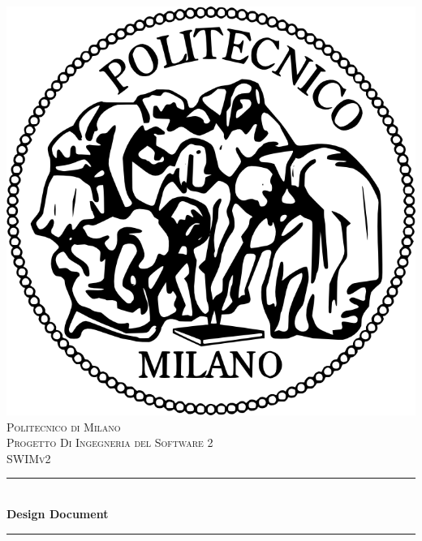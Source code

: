 \documentclass[12pt]{article}
\begin{document}
\begin{titlepage}

\newcommand{\HRule}{\rule{\linewidth}{0.5mm}} %

\center %
\includegraphics[scale=0.22]{polimi.png} \\[2\baselineskip] 
 

\textsc{\LARGE Politecnico di Milano}\\[1cm] %
\textsc{\Large Progetto Di Ingegneria del Software 2}\\[0.5cm] %
\textsc{\large SWIMv2}\\[0.5cm] %


\HRule \\[0.4cm]
{ \huge \bfseries Design Document}\\[0.3cm] %
\HRule \\[1cm]
 

\end{titlepage}
\end{document}

